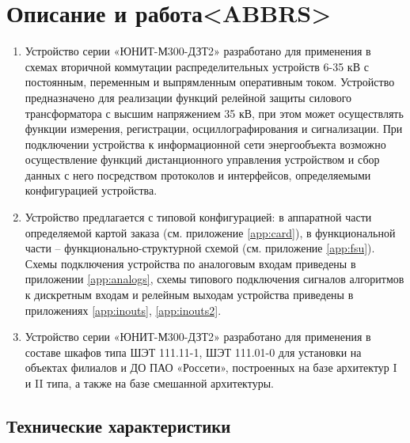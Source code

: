 
\color{unidarkgreen}\section[Описание и работа]{Описание и работа\color{white!0}<ABBRS>} %
\color{black}

\color{black}

\begin{enumerate}[label=\arabic{section}.\arabic{subsection}.\arabic*, labelsep=4pt, leftmargin=0pt, itemindent=57pt]

\item
Устройство серии «ЮНИТ-М300-ДЗТ2» разработано для применения в схемах вторичной коммутации распределительных устройств 6-35 кВ с постоянным, переменным и выпрямленным оперативным током. Устройство предназначено для реализации функций релейной защиты силового трансформатора с высшим напряжением 35 кВ, при этом может осуществлять функции измерения, регистрации, осциллографирования и сигнализации. При подключении устройства к информационной сети энергообъекта возможно осуществление функций дистанционного управления устройством и сбор данных с него посредством протоколов и интерфейсов, определяемыми конфигурацией устройства.
\item 
Устройство предлагается с типовой конфигурацией: в аппаратной части определяемой картой заказа (см. приложение \ref{app:card}), в функциональной части -- функционально-структурной схемой (см. приложение \ref{app:fsu}). Схемы подключения устройства по аналоговым входам приведены в приложении \ref{app:analogs}, схемы типового подключения сигналов алгоритмов к дискретным входам и релейным выходам устройства приведены в приложениях \ref{app:inouts}, \ref{app:inouts2}.
\item
Устройство серии «ЮНИТ-М300-ДЗТ2» разработано для применения в составе шкафов типа ШЭТ 111.11-1, ШЭТ 111.01-0 для установки на объектах филиалов и ДО ПАО «Россети», построенных на базе архитектур I и II типа, а также на базе смешанной архитектуры.

\end{enumerate}


\color{unidarkgreen}\subsection{Технические характеристики}
\color{black}

